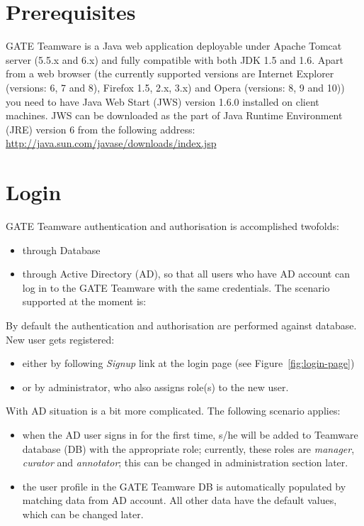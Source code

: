 \section{Prerequisites}
GATE Teamware is a Java web application deployable under Apache Tomcat server
(5.5.x and 6.x) and fully compatible with both JDK 1.5 and 1.6. 
Apart from a web browser (the currently supported versions are Internet
Explorer (versions: 6, 7 and 8), Firefox 1.5, 2.x, 3.x) and Opera (versions: 8,
9 and 10)) you need to have Java Web Start (JWS) version 1.6.0 installed on
client machines. JWS can be downloaded as the part of Java Runtime Environment
(JRE) version 6 from the following address:
\url{http://java.sun.com/javase/downloads/index.jsp}

\section{Login}
GATE Teamware authentication and authorisation is accomplished twofolds:
\begin{itemize}
  \item through Database
  \item through Active Directory (AD), so that all users who have AD account can
  log in to the GATE Teamware with the same credentials. The scenario supported at
the moment is:
\end{itemize}

By default the authentication and authorisation are performed against database.
New user gets registered:
\begin{itemize}
  \item either by following \emph{Signup} link at the login page (see
  Figure~\ref{fig:login-page})
  \item  or by administrator, who also assigns role(s) to the new user. 
\end{itemize}

With AD situation is a bit more complicated. The following scenario applies:

\begin{itemize}
\item when the AD user signs in for the first time, s/he will be added to
Teamware database (DB) with the appropriate role; currently, these roles are \emph{manager},
\emph{curator} and \emph{annotator}; this can be changed in administration section
later.
\item the user profile in the GATE Teamware DB is automatically populated by
matching data from AD account. All other data have the default values, which can be
changed later.
\end{itemize}


